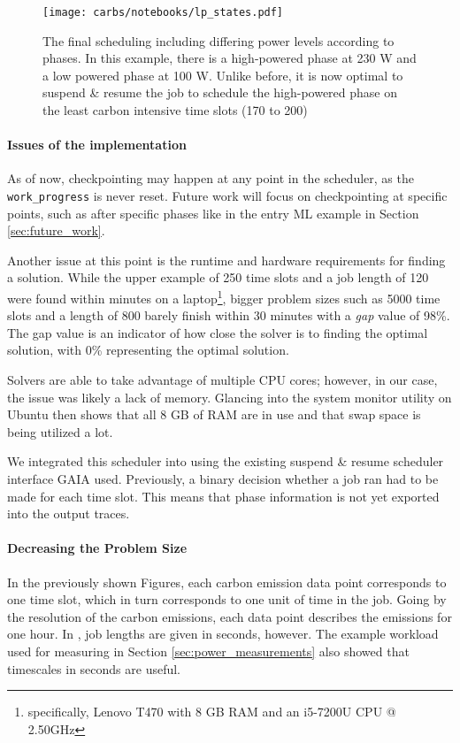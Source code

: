 \begin{figure}
    \texttt{[image: carbs/notebooks/lp\_states.pdf]}
    \caption{The final scheduling including differing power levels according to phases. In this example, there is a high-powered phase at 230 W and a low powered phase at 100 W. Unlike before, it is now optimal to suspend \& resume the job to schedule the high-powered phase on the least carbon intensive time slots (170 to 200)}
    \label{fig:lp_states}
\end{figure}

\paragraph{Issues of the implementation}

As of now, checkpointing may happen at any point in the scheduler, as the \verb|work_progress| is never reset. 
Future work will focus on checkpointing at specific points, such as after specific phases like in the entry ML example in Section \ref{sec:future_work}.

Another issue at this point is the runtime and hardware requirements for finding a solution.
While the upper example of 250 time slots and a job length of 120 were found within minutes on a laptop\footnote{specifically, Lenovo T470 with 8 GB RAM and an i5-7200U CPU @ 2.50GHz}, bigger problem sizes such as 5000 time slots and a length of 800 barely finish within 30 minutes with a \emph{gap} value of 98\%.
The gap value is an indicator of how close the solver is to finding the optimal solution, with 0\% representing the optimal solution.

Solvers are able to take advantage of multiple CPU cores; however, in our case, the issue was likely a lack of memory. 
Glancing into the system monitor utility on Ubuntu then shows that all 8 GB of RAM are in use and that swap space is being utilized a lot.

We integrated this scheduler into \programname{} using the existing suspend \& resume scheduler interface GAIA used.
Previously, a binary decision whether a job ran had to be made for each time slot.
This means that phase information is not yet exported into the output traces.

\paragraph{Decreasing the Problem Size}

In the previously shown Figures, each carbon emission data point corresponds to one time slot, which in turn corresponds to one unit of time in the job. 
Going by the resolution of the carbon emissions, each data point describes the emissions for one hour. 
In \programname{}, job lengths are given in seconds, however. 
The example workload used for measuring in Section \ref{sec:power_measurements} also showed that timescales in seconds are useful. 

